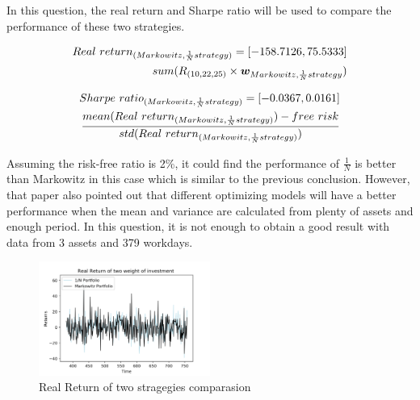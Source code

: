 \documentclass[sigconf]{acmart}
\begin{document}
In this question, the real return and Sharpe ratio will be used to compare the performance of these two strategies.

\begin{equation} \label{eq7}
\begin{split}
\setlength{\abovedisplayskip}{3pt}
\setlength{\belowdisplayskip}{3pt}
Real\ return_{(Markowitz,\frac{1}{N}strategy)} = [-158.7126,75.5333]\\
sum(R_{(10,22,25)} \times \bm{w}_{Markowitz,\frac{1}{N}strategy})
\end{split}
\end{equation}

\begin{equation} \label{eq8}
\setlength{\abovedisplayskip}{3pt}
\setlength{\belowdisplayskip}{3pt}
\begin{split}
Sharpe\ ratio_{(Markowitz,\frac{1}{N}strategy)} = [-0.0367,0.0161]\\
\frac{mean(Real\ return_{(Markowitz,\frac{1}{N}strategy)})-free\ risk}{std(Real\ return_{(Markowitz,\frac{1}{N}strategy)})}
\end{split}
\end{equation}

Assuming the risk-free ratio is 2\%, it could find the performance of $\frac{1}{N}$ is better than Markowitz in this case which is similar to the previous conclusion. However, that paper also pointed out that different optimizing models will have a better performance when the mean and variance are calculated from plenty of assets and enough period\cite{demiguel2007optimal}. In this question, it is not enough to obtain a good result with data from 3 assets and 379 workdays.

\begin{figure}[htbp]
    \centering
    \includegraphics[width=0.5\textwidth]{7.png}
    \caption{\label{}Real Return of two stragegies comparasion}
\end{figure}

\end{document}
